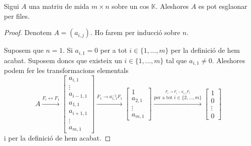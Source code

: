\documentclass[../Apunts.tex]{subfiles}
\begin{document}
	\begin{proposition}
		\label{prop:es pot esglaonar qualsevol matriu per files}
		Sigui \(A\) una matriu de mida \(m\times n\) sobre un cos \(\mathbb{K}\). Aleshores \(A\) es pot esglaonar per files.
		\begin{proof} %
			Denotem \(A=(a_{i,j})\). Ho farem per inducció sobre \(n\).
			
			Suposem que \(n=1\). Si \(a_{i,1}=0\) per a tot \(i\in\{1,\dots,m\}\) per la definició de  hem acabat. Suposem doncs que existeix un \(i\in\{1,\dots,m\}\) tal que \(a_{i,1}\neq0\). Aleshores podem fer les transformacions elementals
			\[A
			\overset{F_{i}\leftrightarrow F_{1}}{\longrightarrow}
			\left[\begin{matrix}
			a_{i,1}\\
			\vdots\\
			a_{i-1,1}\\
			a_{1,1}\\
			a_{i+1,1}\\
			\vdots\\
			a_{m,1}
			\end{matrix}\right]
			\overset{F_{1}\rightarrow a_{1,1}^{-1}F_{1}}{\longrightarrow}
			\left[\begin{matrix}
			1\\
			a_{2,1}\\
			\vdots\\
			a_{m,1}
			\end{matrix}\right]
			\overset{\overset{F_{i}\rightarrow F_{i}-a_{i,1}F_{1}}{\text{per a tot }i\in\{2,\dots,m\}}}{\longrightarrow}
			\left[\begin{matrix}
			1\\
			0\\
			\vdots\\
			0
			\end{matrix}\right]\]
			i per la definició de  hem acabat.
			

\end{proof}
\end{proposition}
\end{document}
